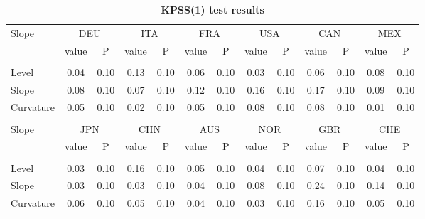 \documentclass[12pt,bibliography=totoc]{article}
\begin{document}
\begin{appendices}
\begin{table}
\begin{subtable}[t]{1\textwidth}
\begin{tabular}{l cc cc cc cc cc cc}
Slope	&	\multicolumn{2}{c}{DEU}			&	\multicolumn{2}{c}{ITA}			&	\multicolumn{2}{c}{FRA}			&	\multicolumn{2}{c}{USA}			&	\multicolumn{2}{c}{CAN}			&	\multicolumn{2}{c}{MEX}			\\[0.5ex] 

 & value &P & value &P& value &P & value &P& value &P & value &P\\

\hline       \\ [-1.5ex] 

Level	&	0.04	&	0.10	&	0.13	&	0.10	&	0.06	&	0.10	&	0.03	&	0.10	&	0.06	&	0.10	&	0.08	&	0.10	\\
Slope	&	0.08	&	0.10	&	0.07	&	0.10	&	0.12	&	0.10	&	0.16	&	0.10	&	0.17	&	0.10	&	0.09	&	0.10	\\
Curvature	&	0.05	&	0.10	&	0.02	&	0.10	&0.05	&	0.10	&	0.08	&	0.10	&	0.08	&	0.10	&	0.01	&	0.10	\\


\hline   \\ [-1.5ex]    

Slope	&	\multicolumn{2}{c}{JPN}			&	\multicolumn{2}{c}{CHN}			&	\multicolumn{2}{c}{AUS}			&	\multicolumn{2}{c}{NOR}			&	\multicolumn{2}{c}{GBR}			&	\multicolumn{2}{c}{CHE}			\\

 & value &P & value &P& value &P & value &P& value &P & value &P\\

\hline       \\ [-1.5ex] 

Level	&	0.03	&	0.10	&	0.16	&	0.10	&	0.05	&	0.10	&	0.04	&	0.10	&	0.07	&	0.10	&	0.04	&	0.10	\\
Slope	&	0.03	&	0.10	&	0.03	&	0.10	&	0.04	&	0.10	&	0.08	&	0.10	&	0.24	&	0.10	&	0.14	&	0.10	\\
Curvature	&	0.06	&	0.10	&	0.05	&	0.10	&	0.04	&	0.10	&	0.03	&	0.10	&	0.16	&	0.10	&	0.05	&	0.10	\\


\hline
\end{tabular}
\caption{\textbf{KPSS(1) test results}}
\end{subtable}
\hspace{\fill}
\end{table}




\end{appendices}
\end{document}
